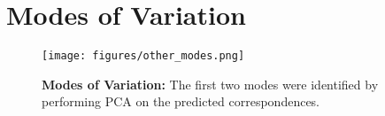 \appendices

\section{Modes of Variation}
\begin{figure}
    \centering
    \texttt{[image: figures/other\_modes.png]}
    \caption{\textbf{Modes of Variation:} The first two modes were identified by performing PCA on the predicted correspondences.}
    \label{fig:enter-label}
\end{figure}

